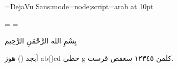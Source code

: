 


\font\aaa={DejaVu Sans:mode=node;script=arab} at 10pt\aaa

\showboxdepth=\maxdimen
\showboxbreadth=\maxdimen



\centerline{بِسْمِ الله الرَّحْمَنِ الرَّحِيم}

أبجد () هوز ab()cd حطي g كلمن ١٢٣٤٥ سعفص قرست.
\bye
